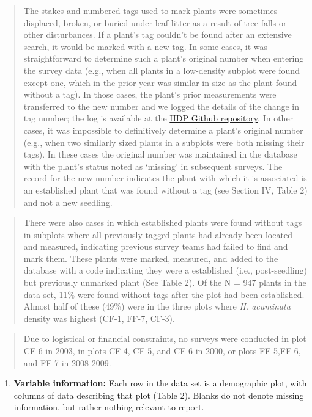 \documentclass[
  12pt,
  man, donotrepeattitle,floatsintext]{apa6}
\providecommand{\tightlist}{%
  \setlength{\itemsep}{0pt}\setlength{\parskip}{0pt}}
\begin{document}
\begin{quote}
The stakes and numbered tags used to mark plants were sometimes displaced, broken, or buried under leaf litter as a result of tree falls or other disturbances. If a plant's tag couldn't be found after an extensive search, it would be marked with a new tag. In some cases, it was straightforward to determine such a plant's original number when entering the survey data (e.g., when all plants in a low-density subplot were found except one, which in the prior year was similar in size as the plant found without a tag). In those cases, the plant's prior measurements were transferred to the new number and we logged the details of the change in tag number; the log is available at the \href{https://github.com/BrunaLab/HeliconiaSurveys}{HDP Github repository}. In other cases, it was impossible to definitively determine a plant's original number (e.g., when two similarly sized plants in a subplots were both missing their tags). In these cases the original number was maintained in the database with the plant's status noted as `missing' in subsequent surveys. The record for the new number indicates the plant with which it is associated is an established plant that was found without a tag (see Section IV, Table 2) and not a new seedling.
\end{quote}

\begin{quote}
There were also cases in which established plants were found without tags in subplots where all previously tagged plants had already been located and measured, indicating previous survey teams had failed to find and mark them. These plants were marked, measured, and added to the database with a code indicating they were a established (i.e., post-seedling) but previously unmarked plant (See Table 2). Of the N = 947 plants in the data set, 11\% were found without tags after the plot had been established. Almost half of these (49\%) were in the three plots where \emph{H. acuminata} density was highest (CF-1, FF-7, CF-3).
\end{quote}

\begin{quote}
Due to logistical or financial constraints, no surveys were conducted in plot CF-6 in 2003, in plots CF-4, CF-5, and CF-6 in 2000, or plots FF-5,FF-6, and FF-7 in 2008-2009.
\end{quote}

\begin{enumerate}
\def\labelenumi{\arabic{enumi}.}
\setcounter{enumi}{9}
\tightlist
\item
  \textbf{Variable information:} Each row in the data set is a demographic plot, with columns of data describing that plot (Table 2). Blanks do not denote missing information, but rather nothing relevant to report.
\end{enumerate}
\end{document}
